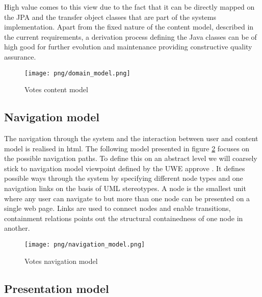 High value comes to this view due to the fact that it can be directly mapped on the JPA and the transfer object classes that are part of the systems implementation. Apart from the fixed nature of the content model, described in the current requirements, a derivation process defining the Java classes can be of high good for further evolution and maintenance providing constructive quality assurance.



\begin{figure}
\centering
\texttt{[image: png/domain\_model.png]}
\caption{Votes content model}
\label{F:content_model}
\end{figure}


\subsection{Navigation model}
The navigation through the system and the interaction between user and content model is realised in html. The following model presented in figure \ref{F:navigation_model} focuses on the possible navigation paths. To define this on an abstract level we will coarsely stick to navigation model viewpoint defined by the UWE approve \cite{Uwe08,uweref}. It defines possible ways through the system by specifying different node types and one navigation links on the basis of UML stereotypes. A node is the smallest unit where any user can navigate to but more than one node can be presented on a single web page. Links are used to connect nodes and enable transitions, containment relations points out the structural containedness of one node in another.

\begin{figure}
\centering
\texttt{[image: png/navigation\_model.png]}
\caption{Votes navigation model}
\label{F:navigation_model}
\end{figure}

\subsection{Presentation model}

